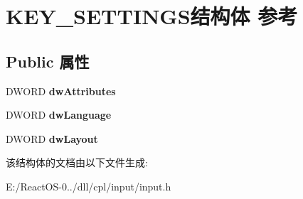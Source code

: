 \hypertarget{struct_k_e_y___s_e_t_t_i_n_g_s}{}\section{K\+E\+Y\+\_\+\+S\+E\+T\+T\+I\+N\+G\+S结构体 参考}
\label{struct_k_e_y___s_e_t_t_i_n_g_s}
\subsection*{Public 属性}
\begin{DoxyCompactItemize}
\item 
\mbox{\label{struct_k_e_y___s_e_t_t_i_n_g_s_a12c600dea0e1e457eefb0dcb71fb7279}} 
D\+W\+O\+RD {\bfseries dw\+Attributes}
\item 
\mbox{\label{struct_k_e_y___s_e_t_t_i_n_g_s_a3b4ca8ba17f89d220e329df06ff6169f}} 
D\+W\+O\+RD {\bfseries dw\+Language}
\item 
\mbox{\label{struct_k_e_y___s_e_t_t_i_n_g_s_a8bbc40b84efc77f337d073fd3657658b}} 
D\+W\+O\+RD {\bfseries dw\+Layout}
\end{DoxyCompactItemize}


该结构体的文档由以下文件生成\+:\begin{DoxyCompactItemize}
\item 
E\+:/\+React\+O\+S-\/0../dll/cpl/input/input.\+h\end{DoxyCompactItemize}
